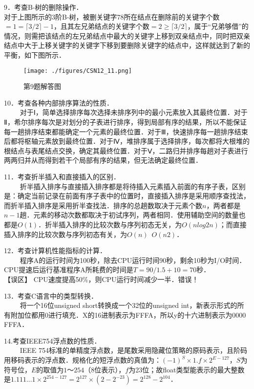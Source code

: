 9．考查B-树的删除操作．\\
对于上图所示的3阶B-树，被删关键字78所在结点在删除前的关键字个数$=1= \lceil 3/2 \rceil -1$，且其左兄弟结点的关键字个数$=2 \ge \lceil 3/2 \rceil $，属于“兄弟够借”的情况，则需把该结点的左兄弟结点中最大的关键字上移到双亲结点中，同时把双亲结点中大于上移关键字的关键字下移到要删除关键字的结点中，这样就达到了新的平衡，如下图所示．
\begin{figure}[ht]
\centering
\texttt{[image: ./figures/CSN12\_11.png]}
\caption{第9题解答图} \label{CSN12_fig11}
\end{figure}

10．考查各种内部排序算法的性质．\\
$\qquad$ 对于Ⅰ，简单选择排序每次选择未排序列中的最小元素放入其最终位置．对于Ⅱ，希尔排序每次是对划分的子表进行排序，得到局部有序的结果，所以不能保证每一趟排序结束都能确定一个元素的最终位置．对于Ⅲ，快速排序每一趟排序结束后都将枢轴元素放到最终位置．对于Ⅳ，堆排序属于选择排序，每次都将大根堆的根结点与表尾结点交换，确定其最终位置．对于Ⅴ，二路归并排序每趟对子表进行两两归并从而得到若干个局部有序的结果，但无法确定最终位置．

11．考查折半插入和直接插入的区别．\\
$\qquad$ 折半插入排序与直接插入排序都是将待插入元素插入前面的有序子表，区别是：确定当前记录在前面有序子表中的位置时，直接插入排序是采用顺序查找法，而折半插入排序是采用折半查找法．排序的总趟数取决于元素个数$n$，两者都是$n-1$趟．元素的移动次数都取决于初试序列，两者相同．使用辅助空间的数量也都是$O(1)$．折半插入排序的比较次数与序列初态无关，为$O(nlog2n)$；而直接插入排序的比较次数与序列初态有关，为$O(n)$~$O(n2)$．

12．考查计算机性能指标的计算．\\
$\qquad$ 程序A的运行时间为100秒，除去CPU运行时间90秒，剩余10秒为I/O时间．CPU提速后运行基准程序A所耗费的时间是$T=90/1.5+10=70$秒． \\
【误区】 CPU速度提高50\%，则CPU运行时间减少一半．错误！

13．考查C语言中的类型转换．\\
$\qquad$ 将一个16位unsigned short转换成一个32位的unsigned int，新表示形式的所有附加位都用0进行填充．X的16进制表示为FFFA，所以y的十六进制表示为0000 FFFA．

14.考查IEEE754浮点数的性质．\\
$\qquad$ IEEE 754标准的单精度浮点数，是尾数采用隐藏位策略的原码表示，且阶码用移码表示的浮点数．规格化的短浮点数的真值为：$(-1)^S\times1.f\times2^{E-127}$，$S$为符号位，$E$的取值为$1$～$254$（$8$位表示），$f$为23位；故float类型能表示的最大整数是$1.111...1 \times 2^{254-127}=2^{127} \times (2-2^{-23})=2^{128}-2^{104}$．

